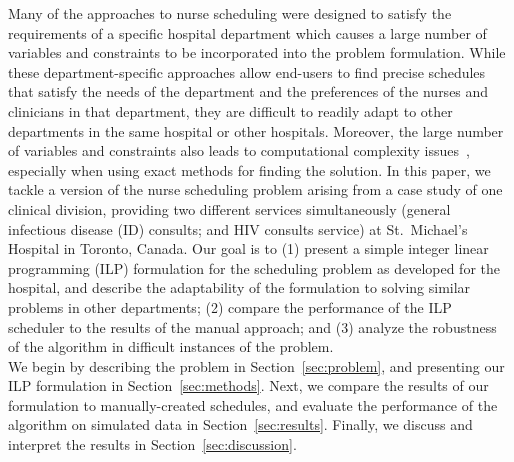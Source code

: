 
Many of the approaches to nurse scheduling were designed to satisfy the
requirements of a specific hospital department which causes a large number of
variables and constraints to be incorporated into the problem formulation. While
these department-specific approaches allow end-users to find precise schedules
that satisfy the needs of the department and the preferences of the nurses and
clinicians in that department, they are difficult to readily adapt to other
departments in the same hospital or other hospitals. %
Moreover, the large number of variables and constraints also leads to
computational complexity issues~\cite{goos_complexity_1996}, especially when
using exact methods for finding the solution. In this paper, we tackle a version
of the nurse scheduling problem arising from a case study of one clinical
division, providing two different services simultaneously (general infectious
disease (ID) consults; and HIV consults service) at St.\ Michael's Hospital in
Toronto, Canada. Our goal is to (1) present a simple integer linear programming
(ILP) formulation for the scheduling problem as developed for the hospital, and
describe the adaptability of the formulation to solving similar problems in
other departments; (2) compare the performance of the ILP scheduler to the
results of the manual approach; and (3) analyze the robustness of the algorithm
in difficult instances of the problem. \\

We begin by describing the problem in Section~\ref{sec:problem}, and presenting
our ILP formulation in Section~\ref{sec:methods}. Next, we compare the results
of our formulation to manually-created schedules, and evaluate the performance
of the algorithm on simulated data in Section~\ref{sec:results}. Finally, we
discuss and interpret the results in Section~\ref{sec:discussion}. %
